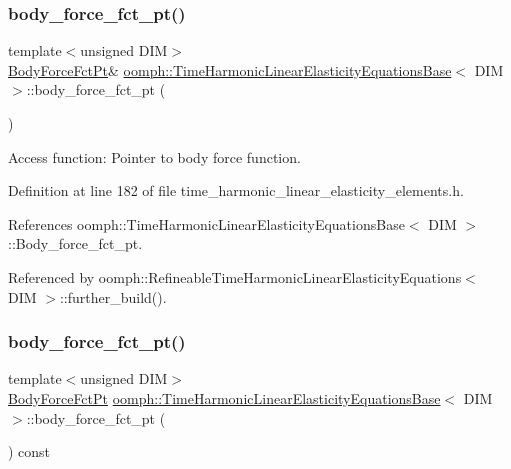 \subsubsection{\texorpdfstring{body\+\_\+force\+\_\+fct\+\_\+pt()}{body\_force\_fct\_pt()}\hspace{0.1cm}{\footnotesize\ttfamily [1/2]}}
{\footnotesize\ttfamily template$<$unsigned D\+IM$>$ \\
\hyperlink{classoomph_1_1TimeHarmonicLinearElasticityEquationsBase_a8cff2941bd4dc9fd3714c151cf5b6e33}{Body\+Force\+Fct\+Pt}\& \hyperlink{classoomph_1_1TimeHarmonicLinearElasticityEquationsBase}{oomph\+::\+Time\+Harmonic\+Linear\+Elasticity\+Equations\+Base}$<$ D\+IM $>$\+::body\+\_\+force\+\_\+fct\+\_\+pt (\begin{DoxyParamCaption}{ }\end{DoxyParamCaption})\hspace{0.3cm}{\ttfamily [inline]}}



Access function\+: Pointer to body force function. 



Definition at line 182 of file time\+\_\+harmonic\+\_\+linear\+\_\+elasticity\+\_\+elements.\+h.



References oomph\+::\+Time\+Harmonic\+Linear\+Elasticity\+Equations\+Base$<$ D\+I\+M $>$\+::\+Body\+\_\+force\+\_\+fct\+\_\+pt.



Referenced by oomph\+::\+Refineable\+Time\+Harmonic\+Linear\+Elasticity\+Equations$<$ D\+I\+M $>$\+::further\+\_\+build().

\mbox{\label{classoomph_1_1TimeHarmonicLinearElasticityEquationsBase_ac9fbd29f0373e6762212b75212b43998}} 
\subsubsection{\texorpdfstring{body\+\_\+force\+\_\+fct\+\_\+pt()}{body\_force\_fct\_pt()}\hspace{0.1cm}{\footnotesize\ttfamily [2/2]}}
{\footnotesize\ttfamily template$<$unsigned D\+IM$>$ \\
\hyperlink{classoomph_1_1TimeHarmonicLinearElasticityEquationsBase_a8cff2941bd4dc9fd3714c151cf5b6e33}{Body\+Force\+Fct\+Pt} \hyperlink{classoomph_1_1TimeHarmonicLinearElasticityEquationsBase}{oomph\+::\+Time\+Harmonic\+Linear\+Elasticity\+Equations\+Base}$<$ D\+IM $>$\+::body\+\_\+force\+\_\+fct\+\_\+pt (\begin{DoxyParamCaption}{ }\end{DoxyParamCaption}) const\hspace{0.3cm}{\ttfamily [inline]}}



